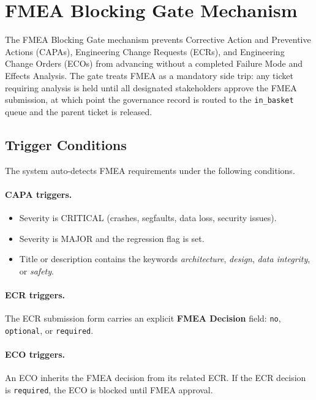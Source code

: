 
\section{FMEA Blocking Gate Mechanism}

The FMEA Blocking Gate mechanism prevents Corrective Action and Preventive Actions (CAPAs),
Engineering Change Requests (ECRs), and Engineering Change Orders (ECOs) from advancing
without a completed Failure Mode and Effects Analysis. The gate treats FMEA as a mandatory
side trip: any ticket requiring analysis is held until all designated stakeholders approve
the FMEA submission, at which point the governance record is routed to the
\texttt{in\_basket} queue and the parent ticket is released.

\subsection{Trigger Conditions}

The system auto-detects FMEA requirements under the following conditions.

\paragraph{CAPA triggers.}
\begin{itemize}
  \item Severity is CRITICAL (crashes, segfaults, data loss, security issues).
  \item Severity is MAJOR and the regression flag is set.
  \item Title or description contains the keywords \emph{architecture}, \emph{design},
        \emph{data integrity}, or \emph{safety}.
\end{itemize}

\paragraph{ECR triggers.}
The ECR submission form carries an explicit \textbf{FMEA Decision} field:
\texttt{no}, \texttt{optional}, or \texttt{required}.

\paragraph{ECO triggers.}
An ECO inherits the FMEA decision from its related ECR. If the ECR decision is
\texttt{required}, the ECO is blocked until FMEA approval.


